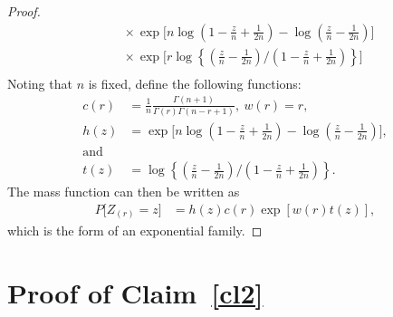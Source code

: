 \documentclass[12pt]{article}
\theoremstyle{plain}
\begin{document}
\begin{appendix}
\begin{proof}
\begin{align*}
	&\hspace{15pt} \times  \exp\bigg[ n\log\left(1-\frac{z}{n} + \frac{1}{2n}\right) - \log \left(\frac{z}{n} - \frac{1}{2n}\right) \bigg] \\
	&\hspace{15pt} \times \exp\bigg[ r\log \left\{\left(\frac{z}{n} - \frac{1}{2n}\right) \bigg/ \left(1-\frac{z}{n} + \frac{1}{2n}\right) \right\}\bigg]\\
\end{align*}
Noting that $n$ is fixed, define the following functions: 
\begin{align*}
	c(r) &= \frac{1}{n}\frac{\Gamma(n+1)}{\Gamma(r)\Gamma(n - r + 1)},\ w(r) = r,\\
	h(z) &= \exp\bigg[ n\log\left(1-\frac{z}{n} + \frac{1}{2n}\right) - \log \left(\frac{z}{n} - \frac{1}{2n}\right) \bigg],\\
	\text{and}\\
	 t(z) &= \log \left\{\left(\frac{z}{n} - \frac{1}{2n}\right) \bigg/ \left(1-\frac{z}{n} + \frac{1}{2n}\right) \right\}.
\end{align*} 
The mass function can then be written as
\begin{align*}
	P\bigg[ Z_{(r)} = z \bigg]  &= h(z)c(r)\exp\left[ w(r)t(z) \right],
\end{align*}
which is the form of an exponential family. 
\end{proof}

\section{Proof of Claim~\ref{cl2}}\label{appC}


\end{appendix}
\end{document}
